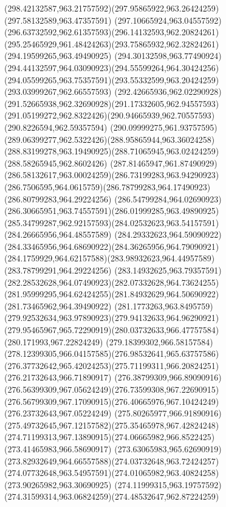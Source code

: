 {    \curveto(298.42132587,963.21757592)(297.95865922,963.26424259)(297.58132589,963.47357591)
    \curveto(297.10665924,963.04557592)(296.63732592,962.61357593)(296.14132593,962.20824261)
    \curveto(295.25465929,961.48424263)(293.75865932,962.32824261)(294.19599265,963.49490925)
    \curveto(294.30132598,963.77490924)(294.44132597,964.03090923)(294.55599264,964.30424256)
    \curveto(294.05599265,963.75357591)(293.55332599,963.20424259)(293.03999267,962.66557593)
    \curveto(292.42665936,962.02290928)(291.52665938,962.32690928)(291.17332605,962.94557593)
    \curveto(291.05199272,962.8322426)(290.94665939,962.70557593)(290.8226594,962.59357594)
    \curveto(290.09999275,961.93757595)(289.06399277,962.5322426)(288.95865944,963.36024258)
    \curveto(288.83199278,963.19490925)(288.71065945,963.02424259)(288.58265945,962.8602426)
    \curveto(287.81465947,961.87490929)(286.58132617,963.00024259)(286.73199283,963.94290923)
    \curveto(286.7506595,964.0615759)(286.78799283,964.17490923)(286.80799283,964.29224256)
    \curveto(286.54799284,964.02690923)(286.30665951,963.74557591)(286.01999285,963.49890925)
    \curveto(285.34799287,962.92157593)(284.02532623,963.54157591)(284.26665956,964.48557589)
    \curveto(284.29332623,964.59090922)(284.33465956,964.68690922)(284.36265956,964.79090921)
    \curveto(284.1759929,964.62157588)(283.98932623,964.44957589)(283.78799291,964.29224256)
    \curveto(283.14932625,963.79357591)(282.28532628,964.07490923)(282.07332628,964.73624255)
    \curveto(281.95999295,964.62424255)(281.84932629,964.50690922)(281.73465962,964.39490922)
    \curveto(281.1773263,963.8495759)(279.92532634,963.97890923)(279.94132633,964.96290921)
    \curveto(279.95465967,965.72290919)(280.03732633,966.47757584)(280.171993,967.22824249)
    \curveto(279.18399302,966.58157584)(278.12399305,966.04157585)(276.98532641,965.63757586)
    \curveto(276.37732642,965.42024253)(275.71199311,966.20824251)(276.21732643,966.71890917)
    \curveto(276.38799309,966.89090916)(276.56399309,967.05624249)(276.73599308,967.22690915)
    \curveto(276.56799309,967.17090915)(276.40665976,967.10424249)(276.23732643,967.05224249)
    \curveto(275.80265977,966.91890916)(275.49732645,967.12157582)(275.35465978,967.42824248)
    \curveto(274.71199313,967.13890915)(274.06665982,966.8522425)(273.41465983,966.58690917)
    \curveto(273.63065983,965.62690919)(273.82932649,964.66557588)(274.03732648,963.72424257)
    \curveto(274.07732648,963.54957591)(274.01065982,963.40824258)(273.90265982,963.30690925)
    \curveto(274.11999315,963.19757592)(274.31599314,963.06824259)(274.48532647,962.87224259)
}

